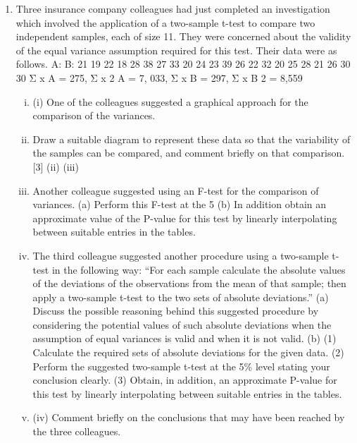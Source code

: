 \documentclass[a4paper,12pt]{article}
\begin{document}
\begin{enumerate}
\item Three insurance company colleagues had just completed an investigation which
involved the application of a two-sample t-test to compare two independent samples, each of size 11. They were concerned about the validity of the equal variance assumption required for this test. Their data were as follows.
A:
B:
21
19
22
18
28
38
27
33
20
24
23
39
26
22
32
20
25
28
21
26
30
30
Σ x A = 275, Σ x 2 A = 7, 033, Σ x B = 297, Σ x B 2 = 8,559
\begin{enumerate}[(i)]
\item (i)
One of the colleagues suggested a graphical approach for the comparison of the variances.
\item Draw a suitable diagram to represent these data so that the variability of the samples can be compared, and comment briefly on that comparison.
[3]
(ii)
(iii)
\item Another colleague suggested using an F-test for the comparison of variances.
(a) Perform this F-test at the 5%
(b) In addition obtain an approximate value of the P-value for this test by linearly interpolating between suitable entries in the tables.
\item 
The third colleague suggested another procedure using a two-sample t-test in the following way:
“For each sample calculate the absolute values of the deviations of the observations from the mean of that sample;
then apply a two-sample t-test to the two sets of absolute deviations.”
(a) Discuss the possible reasoning behind this suggested procedure by considering the potential values of such absolute deviations when the assumption of equal variances is valid and when it is not valid.
(b) (1) Calculate the required sets of absolute deviations for the given
data.
(2) Perform the suggested two-sample t-test at the 5\% level stating your conclusion clearly.
(3) Obtain, in addition, an approximate P-value for this test by linearly interpolating between suitable entries in the tables.
\item (iv)
Comment briefly on the conclusions that may have been reached by the three
colleagues.
\end{enumerate}
\newpage


\end{enumerate}
\end{document}
